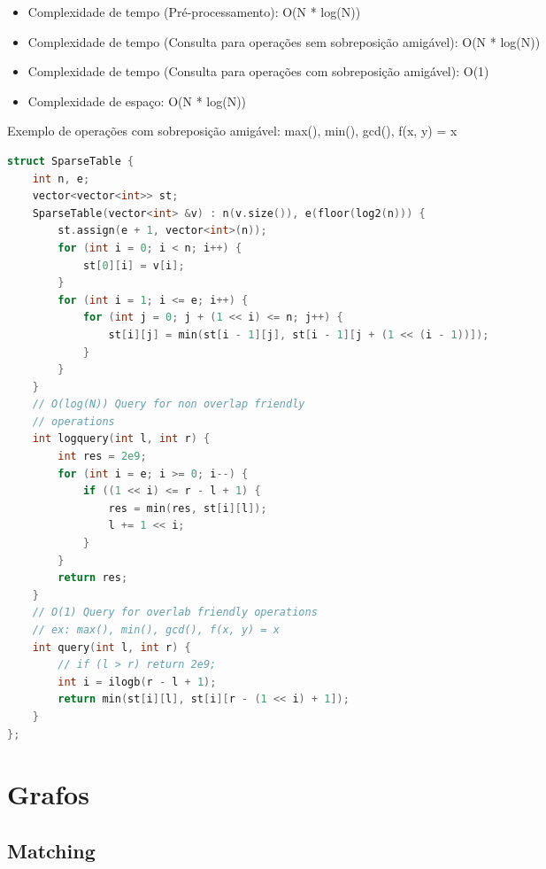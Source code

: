 \documentclass[11pt, a4paper, oneside]{book}
\begin{document}
\begin{itemize}
\item Complexidade de tempo (Pré-processamento): O(N * log(N))
\item Complexidade de tempo (Consulta para operações sem sobreposição amigável): O(N * log(N))
\item Complexidade de tempo (Consulta para operações com sobreposição amigável): O(1)
\item Complexidade de espaço: O(N * log(N))
\end{itemize}



Exemplo de operações com sobreposição amigável: max(), min(), gcd(), f(x, y) = x





\hfill

\begin{multicols}{2}
\begin{lstlisting}[language=C++]
struct SparseTable {
    int n, e;
    vector<vector<int>> st;
    SparseTable(vector<int> &v) : n(v.size()), e(floor(log2(n))) {
        st.assign(e + 1, vector<int>(n));
        for (int i = 0; i < n; i++) {
            st[0][i] = v[i];
        }
        for (int i = 1; i <= e; i++) {
            for (int j = 0; j + (1 << i) <= n; j++) {
                st[i][j] = min(st[i - 1][j], st[i - 1][j + (1 << (i - 1))]);
            }
        }
    }
    // O(log(N)) Query for non overlap friendly
    // operations
    int logquery(int l, int r) {
        int res = 2e9;
        for (int i = e; i >= 0; i--) {
            if ((1 << i) <= r - l + 1) {
                res = min(res, st[i][l]);
                l += 1 << i;
            }
        }
        return res;
    }
    // O(1) Query for overlab friendly operations
    // ex: max(), min(), gcd(), f(x, y) = x
    int query(int l, int r) {
        // if (l > r) return 2e9;
        int i = ilogb(r - l + 1);
        return min(st[i][l], st[i][r - (1 << i) + 1]);
    }
};
\end{lstlisting}
\end{multicols}

\hfill

\newpage

%
%
%
%

\chapter{Grafos}

\section{Matching}
\end{document}
